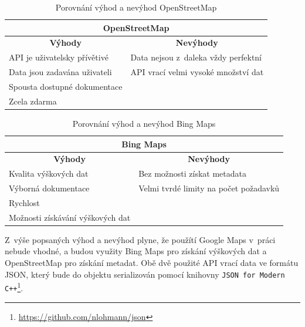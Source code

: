     \begin{table}[h]
    \centering
    \begin{tabular}{| m{18em} | m{18em}|}
    \hline
    \multicolumn{2}{|c|}{\textbf{OpenStreetMap}}                                                \\ \hline
    \multicolumn{1}{|c|}{\textbf{Výhody}}  & \multicolumn{1}{c|}{\textbf{Nevýhody}} \\ \hline
    \multicolumn{1}{|l|}{API je uživatelsky přívětivé} & Data nejsou z~daleka vždy perfektní  \\ \hline
    \multicolumn{1}{|l|}{Data jsou zadavána uživateli} & API vrací velmi vysoké množství dat  \\ \hline
    \multicolumn{1}{|l|}{Spousta dostupné dokumentace}&  \\ \hline
    \multicolumn{1}{|l|}{Zcela zdarma} &     \\ \hline
    \end{tabular}
    \caption{Porovnání výhod a nevýhod OpenStreetMap}
    \label{table:osm}
    \end{table}

    \begin{table}[h]
    \centering
    \begin{tabular}{| m{18em} | m{18em}|}
    \hline
    \multicolumn{2}{|c|}{\textbf{Bing Maps}}   \\ \hline
    \multicolumn{1}{|c|}{\textbf{Výhody}}  & \multicolumn{1}{c|}{\textbf{Nevýhody}} \\ \hline
    \multicolumn{1}{|l|}{Kvalita výškových dat} & Bez možnosti získat metadata          \\ \hline
    \multicolumn{1}{|l|}{Výborná dokumentace}& Velmi tvrdé limity na počet požadavků   \\ \hline
    \multicolumn{1}{|l|}{Rychlost}  &   \\ \hline
    \multicolumn{1}{|l|}{Možnosti získávání výškových dat}  &   \\ \hline
    \end{tabular}
    \caption{Porovnání výhod a nevýhod Bing Maps}
    \label{table:bingmaps}
    \end{table}

Z~výše popsaných výhod a nevýhod plyne, že použítí Google Maps v~práci nebude vhodné, a budou využity Bing Maps pro získání výškových dat a OpenStreetMap pro získání metadat. Obě dvě použité API vrací data ve formátu JSON, který bude do objektu serializován pomocí knihovny \verb|JSON for Modern C++|\footnote{\href{https://github.com/nlohmann/json}{https://github.com/nlohmann/json}}. 
